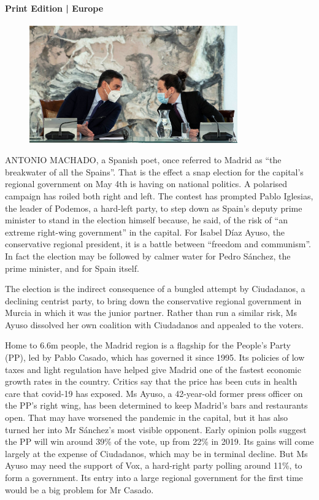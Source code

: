 \documentclass{article}
\begin{document}
\paragraph{Print Edition | Europe  \quad \color{gray}{Mar 27th 2021 }}
\begin{figure}[h]
\centering
\includegraphics[width=0.8\textwidth]{images/20210327_eup502.jpg}
\end{figure}
\lettrine{A}NTONIO MACHADO, a Spanish poet, once referred to Madrid as ``the breakwater of all the Spains''. That is the effect a snap election for the capital's regional government on May 4th is having on national politics. A polarised campaign has roiled both right and left. The contest has prompted Pablo Iglesias, the leader of Podemos, a hard-left party, to step down as Spain's deputy prime minister to stand in the election himself because, he said, of the risk of ``an extreme right-wing government'' in the capital. For Isabel Díaz Ayuso, the conservative regional president, it is a battle between ``freedom and communism''. In fact the election may be followed by calmer water for Pedro Sánchez, the prime minister, and for Spain itself. 

The election is the indirect consequence of a bungled attempt by Ciudadanos, a declining centrist party, to bring down the conservative regional government in Murcia in which it was the junior partner. Rather than run a similar risk, Ms Ayuso dissolved her own coalition with Ciudadanos and appealed to the voters. 

Home to 6.6m people, the Madrid region is a flagship for the People's Party (PP), led by Pablo Casado, which has governed it since 1995. Its policies of low taxes and light regulation have helped give Madrid one of the fastest economic growth rates in the country. Critics say that the price has been cuts in health care that covid-19 has exposed. Ms Ayuso, a 42-year-old former press officer on the PP's right wing, has been determined to keep Madrid's bars and restaurants open. That may have worsened the pandemic in the capital, but it has also turned her into Mr Sánchez's most visible opponent. Early opinion polls suggest the PP will win around 39\% of the vote, up from 22\% in 2019. Its gains will come largely at the expense of Ciudadanos, which may be in terminal decline. But Ms Ayuso may need the support of Vox, a hard-right party polling around 11\%, to form a government. Its entry into a large regional government for the first time would be a big problem for Mr Casado. 
\end{document}
